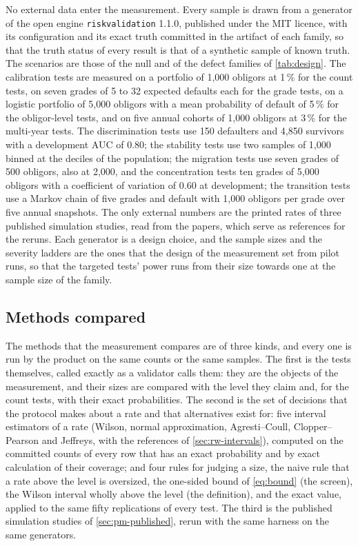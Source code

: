 No external data enter the measurement.
Every sample is drawn from a generator of the open engine \texttt{riskvalidation} 1.1.0, published under the MIT licence, with its configuration and its exact truth committed in the artifact of each family, so that the truth status of every result is that of a synthetic sample of known truth.
The scenarios are those of the null and of the defect families of \cref{tab:design}.
The calibration tests are measured on a portfolio of 1,000 obligors at 1\,\% for the count tests, on seven grades of 5 to 32 expected defaults each for the grade tests, on a logistic portfolio of 5,000 obligors with a mean probability of default of 5\,\% for the obligor-level tests, and on five annual cohorts of 1,000 obligors at 3\,\% for the multi-year tests.
The discrimination tests use 150 defaulters and 4,850 survivors with a development AUC of 0.80; the stability tests use two samples of 1,000 binned at the deciles of the population; the migration tests use seven grades of 500 obligors, also at 2,000, and the concentration tests ten grades of 5,000 obligors with a coefficient of variation of 0.60 at development; the transition tests use a Markov chain of five grades and default with 1,000 obligors per grade over five annual snapshots.
The only external numbers are the printed rates of three published simulation studies, read from the papers, which serve as references for the reruns.
Each generator is a design choice, and the sample sizes and the severity ladders are the ones that the design of the measurement set from pilot runs, so that the targeted tests' power runs from their size towards one at the sample size of the family.

\subsection{Methods compared}
\label{sec:ed-methods}

The methods that the measurement compares are of three kinds, and every one is run by the product on the same counts or the same samples.
The first is the \nTests{} tests themselves, called exactly as a validator calls them: they are the objects of the measurement, and their sizes are compared with the level they claim and, for the count tests, with their exact probabilities.
The second is the set of decisions that the protocol makes about a rate and that alternatives exist for: five interval estimators of a rate (Wilson, normal approximation, Agresti--Coull, Clopper--Pearson and Jeffreys, with the references of \cref{sec:rw-intervals}), computed on the committed counts of every row that has an exact probability and by exact calculation of their coverage; and four rules for judging a size, the naive rule that a rate above the level is oversized, the one-sided bound of \eqref{eq:bound} (the screen), the Wilson interval wholly above the level (the definition), and the exact value, applied to the same fifty replications of every test.
The third is the published simulation studies of \cref{sec:pm-published}, rerun with the same harness on the same generators.

